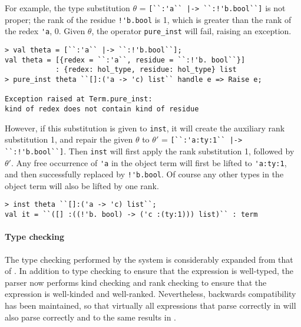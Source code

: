 For example, the type substitution $\theta$ = \verb+[``:'a`` |-> ``:!'b.bool``]+
is not proper; the rank of the residue \verb+!'b.bool+ is 1,
which is greater than the rank of the redex \verb|'a|, 0.
Given $\theta$,
the operator \texttt{pure\_inst} will fail, raising an exception.
%
\begin{session}
\begin{verbatim}
> val theta = [``:'a`` |-> ``:!'b.bool``];
val theta = [{redex = ``:'a``, residue = ``:!'b. bool``}]
            : {redex: hol_type, residue: hol_type} list
> pure_inst theta ``[]:('a -> 'c) list`` handle e => Raise e;

Exception raised at Term.pure_inst:
kind of redex does not contain kind of residue
\end{verbatim}
\end{session}
%

However, if this substitution is given to \texttt{inst}, 
it will create the auxiliary rank substitution 1, and repair the given
$\theta$ to $\theta'$ = \verb+[``:'a:ty:1`` |-> ``:!'b.bool``]+.
Then \texttt{inst} will first apply the rank substitution 1,
followed by $\theta'$.  Any free occurrence of \verb|'a| in the object term
will first be lifted to \verb|'a:ty:1|, and then successfully replaced by
\verb+!'b.bool+.  Of course any other types in the object term
will also be lifted by one rank.
%
\begin{session}
\begin{verbatim}
> inst theta ``[]:('a -> 'c) list``;
val it = ``([] :((!'b. bool) -> ('c :(ty:1))) list)`` : term
\end{verbatim}
\end{session}


\paragraph{Type checking}

The type checking performed by the \HOLW{} system is considerably
expanded from that of \HOL.  In addition to type checking to ensure
that the expression is well-typed, the parser now performs kind checking
and rank checking to ensure that the expression is well-kinded and well-ranked.
Nevertheless, backwards compatibility has been maintained, so that 
virtually all expressions that parse correctly in \HOL{} will also
parse correctly and to the same results in \HOLW.

